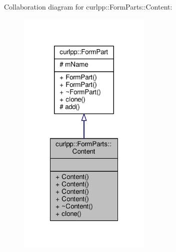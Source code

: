 Collaboration diagram for curlpp\-:\-:Form\-Parts\-:\-:Content\-:
\nopagebreak
\begin{figure}[H]
\begin{center}
\leavevmode
\includegraphics[width=180pt]{classcurlpp_1_1FormParts_1_1Content__coll__graph}
\end{center}
\end{figure}
